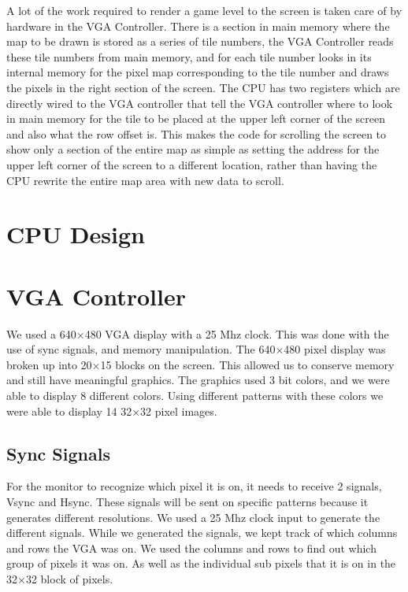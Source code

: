 \documentclass{article}
\begin{document}
A lot of the work required to render a game level to the screen is taken care of by hardware in the VGA Controller. There is a section in main memory where the map to be drawn is stored as a series of tile numbers, the VGA Controller reads these tile numbers from main memory, and for each tile number looks in its internal memory for the pixel map corresponding to the tile number and draws the pixels in the right section of the screen. The CPU has two registers which are directly wired to the VGA controller that tell the VGA controller where to look in main memory for the tile to be placed at the upper left corner of the screen and also what the row offset is. This makes the code for scrolling the screen to show only a section of the entire map as simple as setting the address for the upper left corner of the screen to a different location, rather than having the CPU rewrite the entire map area with new data to scroll.

\section{CPU Design}



\section{VGA Controller}
We used a 640$\times$480 VGA display with a 25 Mhz clock. This was done with the use of sync signals, and memory manipulation. The 640$\times$480 pixel display was broken up into 20$\times$15 blocks on the screen. This allowed us to conserve memory and still have meaningful graphics.  The graphics used 3 bit colors, and we were able to display 8 different colors. Using different patterns with these colors we were able to display 14 32$\times$32 pixel images.

\subsection{Sync Signals}
For the monitor to recognize which pixel it is on, it needs to receive 2 signals, Vsync and Hsync.  These signals will be sent on specific patterns because it generates different resolutions. We used a 25 Mhz clock input to generate the different signals. While we generated the signals, we kept track of which columns and rows the VGA was on. We used the columns and rows to find out which group of pixels it was on.  As well as the individual sub pixels that it is on in the 32$\times$32 block of pixels.
\end{document}
